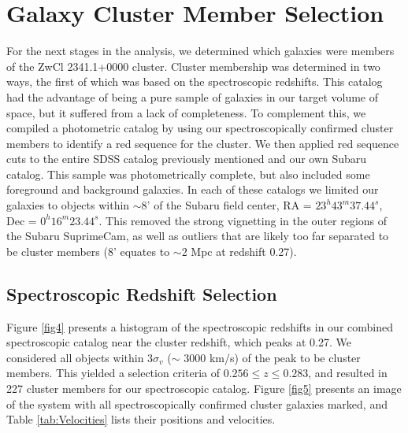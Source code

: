 \documentclass[onecolumn]{aastex}
\begin{document}
\section[]{Galaxy Cluster Member Selection}
For the next stages in the analysis, we determined which galaxies were members of the ZwCl 2341.1+0000 cluster.  Cluster membership was determined in two ways, the first of which was based on the spectroscopic redshifts.  This catalog had the advantage of being a pure sample of galaxies in our target volume of space, but it suffered from a lack of completeness.  To complement this, we compiled a photometric catalog by using our spectroscopically confirmed cluster members to identify a red sequence for the cluster.  We then applied red sequence cuts to the entire SDSS catalog previously mentioned and our own Subaru catalog.  This sample was photometrically complete, but also included some foreground and background galaxies.  In each of these catalogs we limited our galaxies to objects within $\sim$8' of the Subaru field center, RA = $23^h43^m37.44^s$, Dec = $0^h16^m23.44^s$.  This removed the strong vignetting in the outer regions of the Subaru SuprimeCam, as well as outliers that are likely too far separated to be cluster members (8' equates to $\sim$2 Mpc at redshift 0.27).

\subsection{Spectroscopic Redshift Selection}
Figure \ref{fig4} presents a histogram of the spectroscopic redshifts in our combined spectroscopic catalog near the cluster redshift, which peaks at 0.27.  We considered all objects within 3$\sigma_v$ ($\sim$ 3000 km/s) of the peak to be cluster members.  This yielded a selection criteria of $0.256\leq z \leq 0.283$, and resulted in 227 cluster members for our spectroscopic catalog.  Figure \ref{fig5} presents an image of the system with all spectroscopically confirmed cluster galaxies marked, and Table \ref{tab:Velocities} lists their positions and velocities.
\end{document}
